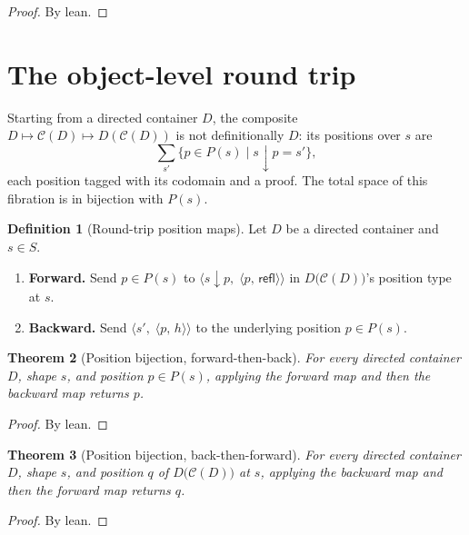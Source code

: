 \documentclass[11pt,a4paper]{article}
\theoremstyle{plain}
\newtheorem{theorem}{Theorem}[section]
\theoremstyle{definition}
\newtheorem{definition}[theorem]{Definition}
\newcommand{\sub}{\mathbin{\downarrow}}
\newcommand{\cat}{\mathcal{C}}
\begin{document}
\begin{proof}
By lean.
\end{proof}

\section{The object-level round trip}

Starting from a directed container $D$, the composite
$D\mapsto\cat(D)\mapsto D(\cat(D))$ is not definitionally $D$: its positions
over $s$ are
\[
  \sum_{s'}\bigl\{p\in P(s) \mid s\sub p = s'\bigr\},
\]
each position tagged with its codomain and a proof. The total space of this
fibration is in bijection with $P(s)$.

\begin{definition}[Round-trip position maps]\label{def:roundtrip-pos}
Let $D$ be a directed container and $s\in S$.
\begin{enumerate}
  \item \textbf{Forward.} Send $p\in P(s)$ to
        $\bigl\langle s\sub p,\; \langle p,\,\mathsf{refl}\rangle\bigr\rangle$
        in $D\bigl(\cat(D)\bigr)$'s position type at $s$.
  \item \textbf{Backward.} Send
        $\bigl\langle s',\; \langle p,\,h\rangle\bigr\rangle$ to the
        underlying position $p\in P(s)$.
\end{enumerate}
\end{definition}

\begin{theorem}[Position bijection, forward-then-back]\label{thm:pos-rt-1}
For every directed container $D$, shape $s$, and position $p\in P(s)$,
applying the forward map and then the backward map returns $p$.
\end{theorem}

\begin{proof}
By lean.
\end{proof}

\begin{theorem}[Position bijection, back-then-forward]\label{thm:pos-rt-2}
For every directed container $D$, shape $s$, and position $q$ of
$D\bigl(\cat(D)\bigr)$ at $s$, applying the backward map and then the forward
map returns $q$.
\end{theorem}

\begin{proof}
By lean.
\end{proof}
\end{document}
